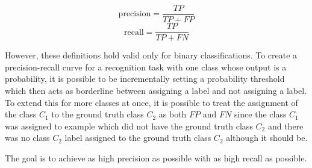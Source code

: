 \begin{equation}
\text{precision} = \frac{TP}{TP+FP}
\label{prec}
\end{equation}
\begin{equation}
\text{recall} = \frac{TP}{TP+FN}
\label{recall}
\end{equation}

However, these definitions hold valid only for binary classifications. To create a precision-recall curve for a recognition task with one class whose output is a probability, it is possible to be incrementally setting a probability threshold which then acts as borderline between assigning a label and not assigning a label. To extend this for more classes at once, it is possible to treat the assignment of the class $C_1$ to the ground truth class $C_2$ as both $FP$ and $FN$ since the class $C_1$ was assigned to example which did not have the ground truth class $C_2$ and there was no class $C_2$ label assigned to the ground truth class $C_2$ although it should be.

The goal is to achieve as high precision as possible with as high recall as possible.
